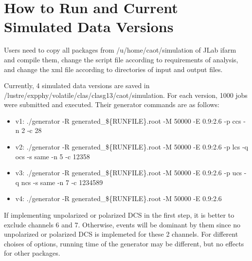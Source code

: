 \documentclass[a4paper]{article}
\begin{document}
\section{How to Run and Current Simulated Data Versions}
Users need to copy all packages from /u/home/caot/simulation of JLab ifarm and compile them, change the script file according to requirements of analysis, and change the xml file according to directories of input and output files.

Currently, 4 simulated data versions are saved in /lustre/expphy/volatile/clas/clasg13/caot/simulation. For each version, 1000 jobs were submitted and executed. Their generator commands are as follows:

\begin{itemize}
\item v1: ./generator -R generated\_\$\{RUNFILE\}.root -M 50000 -E 0.9:2.6 -p ccs -n 2 -c 28
\item v2: ./generator -R generated\_\$\{RUNFILE\}.root -M 50000 -E 0.9:2.6 -p lcs -q ocs -s same -n 5 -c 12358
\item v3: ./generator -R generated\_\$\{RUNFILE\}.root -M 50000 -E 0.9:2.6 -p ucs -q ncs -s same -n 7 -c 1234589
\item v4: ./generator -R generated\_\$\{RUNFILE\}.root -M 50000 -E 0.9:2.6
\end{itemize}

If implementing unpolarized or polarized DCS in the first step, it is better to exclude channels 6 and 7. Otherwise, events will be dominant by them since no unpolarized or polarized DCS is implemeted for these 2 channels. For different choises of options, running time of the generator may be different, but no effects for other packages.
\end{document}
